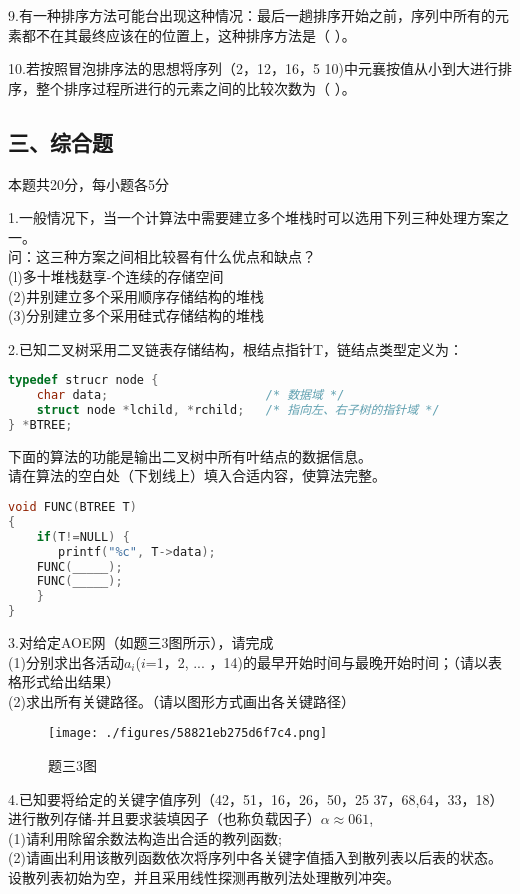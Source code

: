 9.有一种排序方法可能台出现这种情况：最后一趟排序开始之前，序列中所有的元素都不在其最终应该在的位置上，这种排序方法是（    ）。

10.若按照冒泡排序法的思想将序列（2，12，16，5 10)中元襄按值从小到大进行排序，整个排序过程所进行的元素之间的比较次数为（    ）。

\subsection{三、综合题}

本题共20分，每小题各5分

1.一般情况下，当一个计算法中需要建立多个堆栈时可以选用下列三种处理方案之一。 \\
问：这三种方案之间相比较晷有什么优点和缺点？ \\
(l)多十堆栈麸享-个连续的存储空间 \\
(2)井别建立多个采用顺序存储结构的堆栈 \\
(3)分别建立多个采用硅式存储结构的堆栈

2.已知二叉树采用二叉链表存储结构，根结点指针T，链结点类型定义为： \\
\begin{lstlisting}[language=cpp]
typedef strucr node {
    char data;                      /* 数据域 */
    struct node *lchild, *rchild;   /* 指向左、右子树的指针域 */
} *BTREE;
\end{lstlisting}
下面的算法的功能是输出二叉树中所有叶结点的数据信息。 \\
请在算法的空白处（下划线上）填入合适内容，使算法完整。
\begin{lstlisting}[language=cpp]
void FUNC(BTREE T)
{
    if(T!=NULL) {
       printf("%c", T->data);
    FUNC(_____);
    FUNC(_____);
    }
}
\end{lstlisting}

3.对给定AOE网（如题三3图所示），请完成 \\
(1)分别求出各活动$a_i$($i$=1，2, ... ，14)的最早开始时间与最晚开始时间；（请以表格形式给出结果） \\
(2)求出所有关键路径。（请以图形方式画出各关键路径）
\begin{figure}[ht]
\centering
\texttt{[image: ./figures/58821eb275d6f7c4.png]}
\caption{题三3图} \label{fig_BAD13_1}
\end{figure}
4.已知要将给定的关键字值序列（42，51，16，26，50，25 37，68,64，33，18）进行散列存储-并且要求装填因子（也称负载因子）$\alpha\approx061$, \\
(1)请利用除留余数法构造出合适的教列函数; \\
(2)请画出利用该散列函数依次将序列中各关键字值插入到散列表以后表的状态。设散列表初始为空，并且采用线性探测再散列法处理散列冲突。


